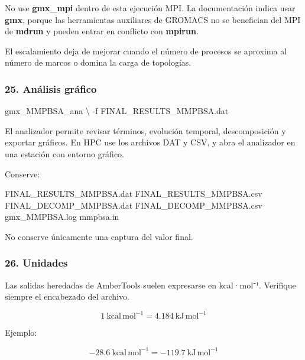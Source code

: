 \documentclass[
  spanish,
  11pt,
  a4paper]{article}
\newenvironment{Shaded}{\begin{snugshade}}{\end{snugshade}}
\newcommand{\AttributeTok}[1]{\textcolor[rgb]{0.13,0.29,0.53}{#1}}
\newcommand{\DataTypeTok}[1]{\textcolor[rgb]{0.13,0.29,0.53}{#1}}
\newcommand{\ExtensionTok}[1]{#1}
\newcommand{\NormalTok}[1]{#1}
\begin{document}
No use \textbf{gmx\_mpi} dentro de esta ejecución MPI. La documentación
indica usar \textbf{gmx}, porque las herramientas auxiliares de GROMACS
no se benefician del MPI de \textbf{mdrun} y pueden entrar en conflicto
con \textbf{mpirun}.

El escalamiento deja de mejorar cuando el número de procesos se aproxima
al número de marcos o domina la carga de topologías.

\subsubsection{25. Análisis gráfico}\label{anuxe1lisis-gruxe1fico}

\begin{Shaded}
\begin{Highlighting}[]
\ExtensionTok{gmx\_MMPBSA\_ana} \DataTypeTok{\textbackslash{}}
    \AttributeTok{{-}f}\NormalTok{ FINAL\_RESULTS\_MMPBSA.dat}
\end{Highlighting}
\end{Shaded}

El analizador permite revisar términos, evolución temporal,
descomposición y exportar gráficos. En HPC use los archivos DAT y CSV, y
abra el analizador en una estación con entorno gráfico.

Conserve:

\begin{Shaded}
\begin{Highlighting}[]
\NormalTok{FINAL\_RESULTS\_MMPBSA.dat}
\NormalTok{FINAL\_RESULTS\_MMPBSA.csv}
\NormalTok{FINAL\_DECOMP\_MMPBSA.dat}
\NormalTok{FINAL\_DECOMP\_MMPBSA.csv}
\NormalTok{gmx\_MMPBSA.log}
\NormalTok{mmpbsa.in}
\end{Highlighting}
\end{Shaded}

No conserve únicamente una captura del valor final.

\subsubsection{26. Unidades}\label{unidades}

Las salidas heredadas de AmberTools suelen expresarse en kcal·mol⁻¹.
Verifique siempre el encabezado del archivo.

\[
1\ \mathrm{kcal\,mol^{-1}}
=
4.184\ \mathrm{kJ\,mol^{-1}}
\]

Ejemplo:

\[
-28.6\ \mathrm{kcal\,mol^{-1}}
=
-119.7\ \mathrm{kJ\,mol^{-1}}
\]
\end{document}

